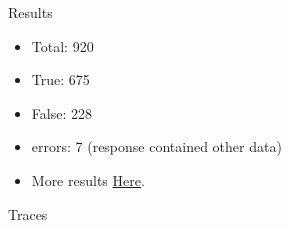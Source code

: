 \begin{frame}{Results}
    \begin{itemize}
        \item Total: 920
        \item True: 675
        \item False: 228
        \item errors: 7 (response contained other data)
        \item More results \href{https://melchizedektp.github.io/nl2ltl/}{Here}.
    \end{itemize}
\end{frame}

\begin{frame}{Traces}
    
\end{frame}
